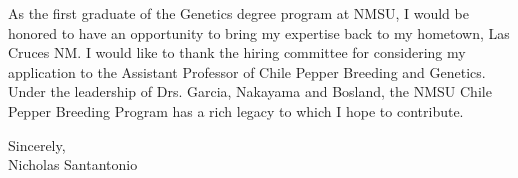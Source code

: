 \documentclass[11pt, letterpaper]{moderncv}
\begin{document}
As the first graduate of the Genetics degree program at NMSU, I would be honored to have an opportunity to bring my expertise back to my hometown, Las Cruces NM. I would like to thank the hiring committee for considering my application to the Assistant Professor of Chile Pepper Breeding and Genetics. Under the leadership of Drs. Garcia, Nakayama and Bosland, the NMSU Chile Pepper Breeding Program has a rich legacy to which I hope to contribute. 

\vspace{3mm}

Sincerely,\\
\vspace{2cm}
Nicholas Santantonio
\end{document}
